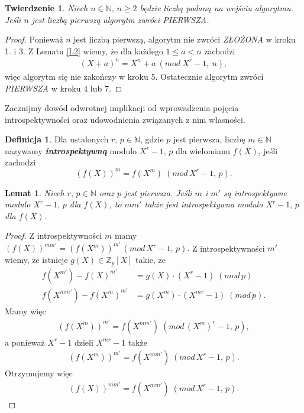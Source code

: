\documentclass[declaration,shortabstract]{iithesis}
\theoremstyle{definition}
\newtheorem{definition}{Definicja}
\theoremstyle{remark} \newtheorem{observation}{Obserwacja}
\theoremstyle{plain} \newtheorem{theorem}{Twierdzenie}
\theoremstyle{plain} \newtheorem{lemma}{Lemat}
\theoremstyle{remark} \newtheorem*{remark*}{Uwaga}
\theoremstyle{reminder} \newtheorem*{reminder*}{Przypomnienie}
\begin{document}
\begin{theorem}
	Niech $n \in \mathbb{N}, \, n \geq 2$ będzie liczbą podaną na wejściu algorytmu. Jeśli $n$ jest liczbą pierwszą algorytm zwróci \textit{PIERWSZA}.
\end{theorem}
	
\begin{proof}
	Ponieważ $n$ jest liczbą pierwszą, algorytm nie zwróci \textit{ZŁOŻONA} w kroku 1. i 3. Z Lematu \ref{L2} wiemy, że dla każdego $1 \leq a < n$ zachodzi 
	\begin{align*}
		(X + a)^n = X^n + a \: (mod \: X^r - 1, \: n), 
	\end{align*}
	więc algorytm się nie zakończy w kroku 5. Ostatecznie algorytm zwróci \textit{PIERWSZA} w kroku 4 lub 7.
\end{proof}

Zacznijmy dowód odwrotnej implikacji od wprowadzenia pojęcia introspektywności oraz udowodnienia związanych z nim własności. 

\begin{definition}
	Dla ustalonych $r, \, p \in \mathbb{N}$, gdzie $p$ jest pierwsza, liczbę $m \in \mathbb{N}$ nazywamy \textbf{\textit{introspektywną}} modulo $X^r - 1, \, p$ dla wielomianu $f(X)$, jeśli zachodzi \[(f(X))^m = f(X^m) \; (mod \, X^r - 1, \, p).\] 
\end{definition}
	
\begin{lemma}\label{intro1}
	Niech $r, \, p \in \mathbb{N}$ oraz $p$ jest pierwsza. Jeśli $m$ i $m'$ są introspektywne modulo $X^r - 1, \, p$ dla $f(X)$, to $mm'$ także jest introspektywna modulo $X^r - 1, \, p$ dla $f(X)$.
\end{lemma}
	
\begin{proof}
	Z introspektywności $m$ mamy $(f(X))^{mm'} = (f(X^m))^{m'} \, (mod \, X^r - 1, \, p).$ Z introspektywności $m'$ wiemy, że istnieje $g(X) \in \mathbb{Z}_p[X]$ takie, że 
	\begin{align*}
		f(X^{m'}) - {f(X)}^{m'}    & = g(X) \cdot (X^r - 1)     \; (mod \, p)   \\
		f(X^{mm'}) - {f(X^m)}^{m'} & = g(X^m) \cdot (X^{mr} - 1) \; (mod \, p). 
	\end{align*}
	Mamy więc 
	\begin{align*}
		(f(X^m))^{m'} = f(X^{mm'}) \; (mod \, (X^m)^r - 1, \, p), 
	\end{align*}
	a ponieważ $X^r - 1$ dzieli $X^{mr} - 1$ także 
	\begin{align*}
		(f(X^m))^{m'} = f(X^{mm'}) \; (mod \, X^r - 1, \, p). 
	\end{align*}
	Otrzymujemy więc 
	\begin{align*}
		(f(X))^{mm'} = f(X^{mm'}) \; (mod \, X^r - 1, \, p). 
	\end{align*}
\end{proof}
	
\end{document}
